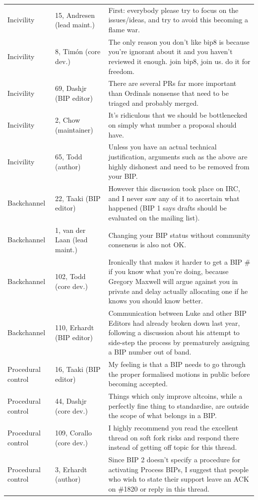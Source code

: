 \documentclass[sigconf,screen]{acmart}
\begin{document}
\begin{table}[t]
\begin{tabular}{p{}p{}p{}}
Incivility & 15, Andresen (lead maint.) & First: everybody please try to focus on the issues/ideas, and try to avoid this becoming a flame war. \\
Incivility & 8, Tim\'on (core dev.) & The only reason you don't like bip8 is because you're ignorant about it and you haven't reviewed it enough. join bip8, join us. do it for freedom. \\
Incivility & 69, Dashjr (BIP editor) & There are several PRs far more important than Ordinals nonsense that need to be triaged and probably merged. \\
Incivility & 2, Chow (maintainer) & It's ridiculous that we should be bottlenecked on simply what number a proposal should have. \\
Incivility & 65, Todd (author) & Unless you have an actual technical justification, arguments such as the above are highly dishonest and need to be removed from your BIP. \\
Backchannel & 22, Taaki (BIP editor) & However this discussion took place on IRC, and I never saw any of it to ascertain what happened (BIP 1 says drafts should be evaluated on the mailing list). \\
Backchannel & 1, van der Laan (lead maint.) & Changing your BIP status without community consensus is also not OK. \\
Backchannel & 102, Todd (core dev.) & Ironically that makes it harder to get a BIP \# if you know what you're doing, because Gregory Maxwell will argue against you in private and delay actually allocating one if he knows you should know better. \\
Backchannel & 110, Erhardt (BIP editor) & Communication between Luke and other BIP Editors had already broken down last year, following a discussion about his attempt to side-step the process by prematurely assigning a BIP number out of band. \\
Procedural control & 16, Taaki (BIP editor) & My feeling is that a BIP needs to go through the proper formalised motions in public before becoming accepted. \\
Procedural control & 44, Dashjr (core dev.) & Things which only improve altcoins, while a perfectly fine thing to standardise, are outside the scope of what belongs in a BIP. \\
Procedural control & 109, Corallo (core dev.) & I highly recommend you read the excellent thread on soft fork risks and respond there instead of getting off topic for this thread. \\
Procedural control & 3, Erhardt (author) & Since BIP 2 doesn't specify a procedure for activating Process BIPs, I suggest that people who wish to state their support leave an ACK on \#1820 or reply in this thread. \\
\bottomrule
\end{tabular}
\end{table}
\end{document}

